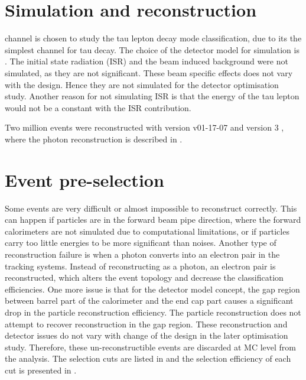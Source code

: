 \section{Simulation and reconstruction}
\label{sec:tauSim}

\eeToTauTau channel is chosen to study the tau lepton decay mode classification, due to its the simplest channel for tau decay. The choice of the detector model for simulation is \ILD. The initial state radiation (ISR) and the beam induced background were not simulated, as they are not significant. These beam specific effects does not vary with the \ECAL design. Hence they are not simulated for the detector optimisation study. Another reason for not simulating ISR is that the energy of the tau lepton would not be a constant with the ISR contribution.

Two million events were reconstructed with  \ilcsoft version v01-17-07 \cite{Gaede:82475} and \pandora version 3 \cite{Marshall:2015rfa}, where the photon reconstruction is described in .


\section{Event pre-selection}
\label{sec:tauPreSel}


Some events are very difficult or almost impossible to reconstruct correctly. This can happen if particles are in the forward beam pipe direction, where the forward calorimeters are not simulated due to computational limitations, or if particles carry too little energies to be more significant than noises. Another type of reconstruction failure is when a photon converts into an electron pair in the tracking systems. Instead of reconstructing as a photon, an electron pair is reconstructed, which  alters the event topology and decrease the classification efficiencies. One more issue is that for the \ILD detector model concept, the gap region between barrel part of the calorimeter and the end cap part causes a significant drop in the particle reconstruction efficiency. The \pandora particle reconstruction does not attempt to recover reconstruction in the gap region. These reconstruction and detector issues do not vary with change of the \ECAL design in the later optimisation study. Therefore, these un-reconstructible events are discarded at MC level from the analysis. The selection cuts are listed in  and the selection efficiency of each cut is presented in .



